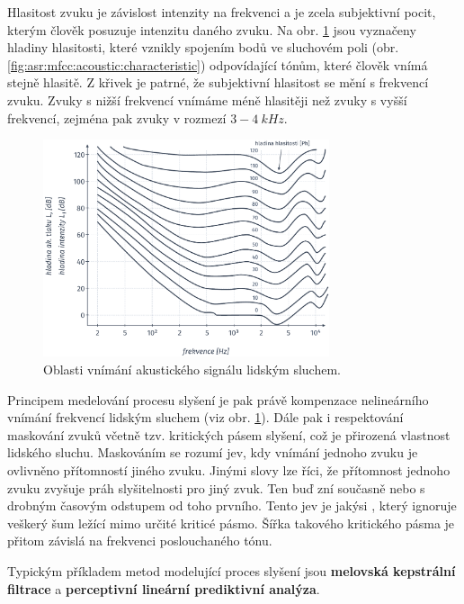 Hlasitost zvuku je závislost intenzity na frekvenci a je zcela subjektivní pocit, kterým člověk posuzuje intenzitu daného zvuku. Na obr. \ref{fig:asr:mfcc:acoustic:levels} jsou vyznačeny hladiny hlasitosti, které vznikly spojením bodů ve sluchovém poli (obr. \ref{fig:asr:mfcc:acoustic:characteristic}) odpovídající tónům, které člověk vnímá stejně hlasitě. Z křivek je patrné, že subjektivní hlasitost se mění s frekvencí zvuku. Zvuky s nižší frekvencí vnímáme méně hlasitěji než zvuky s vyšší frekvencí, zejména pak zvuky v rozmezí $3 - 4\ kHz$. \cite{Psutka2006}

\begin{figure}[hbpt]
  \centering
  \includegraphics[width=0.75\textwidth]{./ch4-asr/img/listening_levels.pdf}
  \caption{Oblasti vnímání akustického signálu lidským sluchem.}
  \label{fig:asr:mfcc:acoustic:levels}
\end{figure}

Principem medelování procesu slyšení je pak právě kompenzace nelineárního vnímání frekvencí lidským sluchem (viz obr. \ref{fig:asr:mfcc:acoustic:levels}). Dále pak i respektování maskování zvuků včetně tzv. kritických pásem slyšení, což je přirozená vlastnost lidského sluchu. Maskováním se rozumí jev, kdy vnímání jednoho zvuku je ovlivněno přítomností jiného zvuku. Jinými slovy lze říci, že přítomnost jednoho zvuku zvyšuje práh slyšitelnosti pro jiný zvuk. Ten buď zní současně nebo s drobným časovým odstupem od toho prvního. Tento jev je jakýsi , který ignoruje veškerý šum ležící mimo určité kriticé pásmo. Šířka takového kritického pásma je přitom závislá na frekvenci poslouchaného tónu.

Typickým příkladem metod modelující proces slyšení jsou \textbf{melovská kepstrální filtrace} a \textbf{perceptivní lineární prediktivní analýza}.

